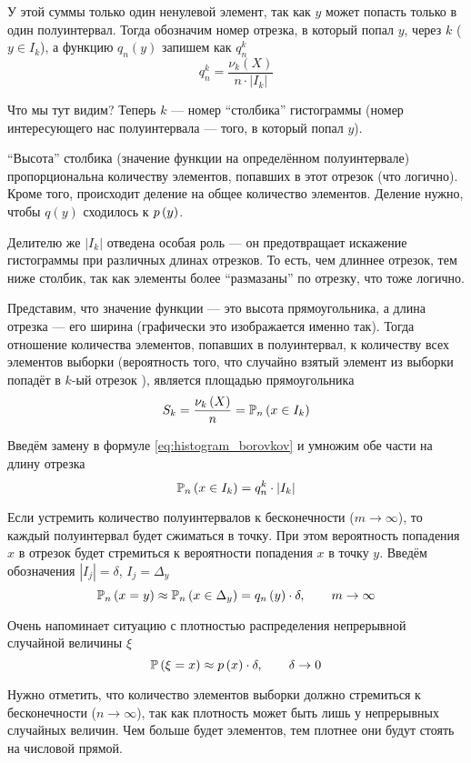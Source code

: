 У этой суммы только один ненулевой элемент,
так как $y$ может попасть только в один полуинтервал.
Тогда обозначим номер отрезка, в который попал $y$, через $k$ ($y\in I_k$),
а функцию $q_n\left(y\right)$ запишем как $q_n^k$
\begin{equation}\label{eq:histogram_borovkov}
q_n^k=
    \frac{\nu_k\left(X\right)}{n\cdot\left|I_k\right|}
\end{equation}


Что мы тут видим? Теперь $k$ --- номер ``столбика'' гистограммы
(номер интересующего нас полуинтервала --- того, в который попал $y$).

``Высота'' столбика (значение функции на определённом полуинтервале)
пропорциональна количеству элементов, попавших в этот отрезок (что логично).
Кроме того, происходит деление на общее количество элементов. Деление нужно,
чтобы $q\left(y\right)$ сходилось к $p\left(y\right)$.

Делителю же $\left|I_k\right|$ отведена особая роль --- он предотвращает
искажение гистограммы при различных длинах отрезков.
То есть, чем длиннее отрезок, тем ниже столбик,
так как элементы более ``размазаны'' по отрезку, что тоже логично.

Представим, что значение функции --- это высота прямоугольника,
а длина отрезка --- его ширина (графически это изображается именно так).
Тогда отношение количества элементов, попавших в полуинтервал,
к количеству всех элементов выборки
(вероятность того,
что случайно взятый элемент из выборки
попадёт в $k$-ый отрезок \cite[стр.~24]{BorovkovMS}),
является площадью прямоугольника
$$S_k=\frac{\nu_k\left(X\right)}{n}=\mathbb{P}_n\left( x\in I_k \right)$$

Введём замену в формуле \eqref{eq:histogram_borovkov}
и умножим обе части на длину отрезка
$$\mathbb{P}_n\left( x\in I_k \right)=q_n^k\cdot\left|I_k\right|$$

Если устремить количество полуинтервалов к бесконечности ($m\to\infty$),
то каждый полуинтервал будет сжиматься в точку.
При этом вероятность попадения $x$ в отрезок будет стремиться
к вероятности попадения $x$ в точку $y$.
Введём обозначения $|I_j|=\delta$, $I_j=\Delta_y$
$$\mathbb{P}_n\left( x=y \right)
\approx\mathbb{P}_n\left( x\in\Delta_y \right)=q_n\left(y\right)\cdot\delta,
\qquad m\to\infty$$

Очень напоминает ситуацию с плотностью распределения
непрерывной случайной величины $\xi$
$$\mathbb{P}\left( \xi=x \right)\approx p\left(x\right)\cdot\delta,\qquad\delta\to 0$$

Нужно отметить,
что количество элементов выборки
должно стремиться к бесконечности ($n\to\infty$),
так как плотность может быть лишь у непрерывных случайных величин.
Чем больше будет элементов,
тем плотнее они будут стоять на числовой прямой.

